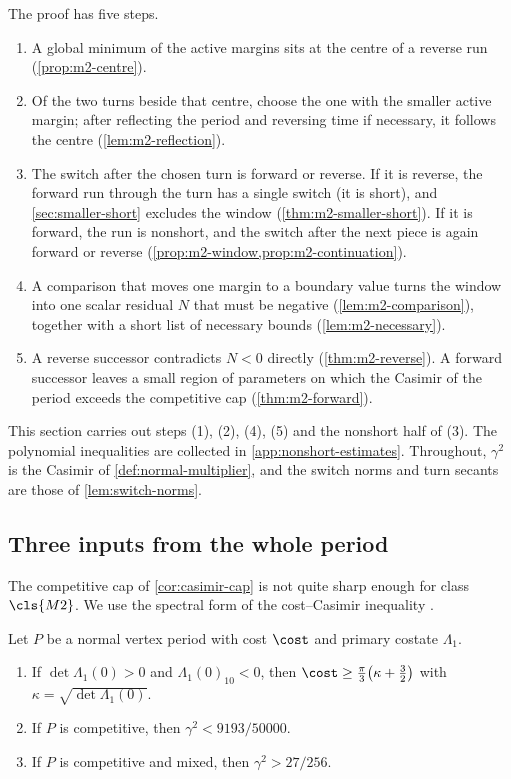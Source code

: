The proof has five steps.
\begin{enumerate}[label=(\arabic*)]
\item A global minimum of the active margins sits at the centre of a reverse run
(\cref{prop:m2-centre}).
\item Of the two turns beside that centre, choose the one with the smaller active margin; after
reflecting the period and reversing time if necessary, it follows the centre
(\cref{lem:m2-reflection}).
\item The switch after the chosen turn is forward or reverse. If it is reverse, the forward run
through the turn has a single switch (it is short), and \cref{sec:smaller-short} excludes the
window (\cref{thm:m2-smaller-short}). If it is forward, the run is nonshort, and the switch after
the next piece is again forward or reverse (\cref{prop:m2-window,prop:m2-continuation}).
\item A comparison that moves one margin to a boundary value turns the window into one scalar
residual $N$ that must be negative (\cref{lem:m2-comparison}), together with a short list of
necessary bounds (\cref{lem:m2-necessary}).
\item A reverse successor contradicts $N<0$ directly (\cref{thm:m2-reverse}). A forward successor
leaves a small region of parameters on which the Casimir of the period exceeds the competitive cap
(\cref{thm:m2-forward}).
\end{enumerate}
This section carries out steps (1), (2), (4), (5) and the nonshort half of (3). The polynomial
inequalities are collected in \cref{app:nonshort-estimates}. Throughout, $\gamma^2$ is the Casimir of
\cref{def:normal-multiplier}, and the switch norms and turn secants are those of
\cref{lem:switch-norms}.

\subsection{Three inputs from the whole period}\label{sec:m2-inputs}

The competitive cap of \cref{cor:casimir-cap} is not quite sharp enough for class $\cls{M2}$. We use
the spectral form of the cost--Casimir inequality \cite[\texttt{GLOBAL\_\allowbreak SPECTRAL\_\allowbreak COST\_\allowbreak CASIMIR}]{Notes}.

\begin{lemma}\label{lem:m2-casimir}
Let $P$ be a normal vertex period with cost $\cost$ and primary costate $\Lambda_1$.
\begin{enumerate}[label=(\alph*)]
\item If $\det\Lambda_1(0)>0$ and $\Lambda_1(0)_{10}<0$, then
$\cost\ge\frac\pi3\bigl(\kappa+\frac32\bigr)$ with $\kappa=\sqrt{\det\Lambda_1(0)}$.
\item If $P$ is competitive, then $\gamma^2<9193/50000$.
\item If $P$ is competitive and mixed, then $\gamma^2>27/256$.
\end{enumerate}
\end{lemma}

